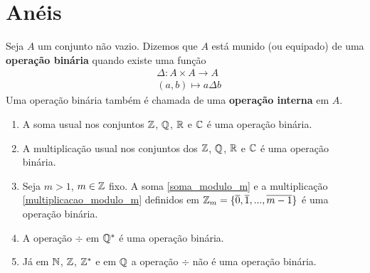\chapter{An{\'e}is}

\begin{definicao}
	Seja $A$ um conjunto n{\~a}o vazio. Dizemos que $A$ est{\'a} munido (ou equipado) de uma \textbf{opera{\c c}{\~a}o bin{\'a}ria} quando existe uma fun{\c c}{\~a}o
	\begin{align*}
		&\Delta : A \times A \to A\\
		&(a,b) \longmapsto a\Delta b		
	\end{align*}
	Uma opera{\c c}{\~a}o bin{\'a}ria tamb{\'e}m {\'e} chamada de uma \textbf{opera{\c c}{\~a}o interna} em $A$.
\end{definicao}

\begin{exemplos}
	\begin{enumerate}[label={\arabic*})]
		\item A soma usual nos conjuntos $\mathbb{Z}$, $\mathbb{Q}$, $\mathbb{R}$ e $\mathbb{C}$ {\'e} uma opera{\c c}{\~a}o bin{\'a}ria.

		\item A multiplicação usual nos conjuntos dos $\mathbb{Z}$, $\mathbb{Q}$, $\mathbb{R}$ e $\mathbb{C}$ {\'e} uma opera{\c c}{\~a}o bin{\'a}ria.

		\item Seja $m > 1$, $m \in \mathbb{Z}$ fixo. A soma \eqref{soma_modulo_m} e a multiplicação \eqref{multiplicacao_modulo_m} definidos em $\mathbb{Z}_m = \{\overline{0},\overline{1},...,\overline{m-1}\}$ é uma operação binária.

		\item A operação $\div$ em $\mathbb{Q}^{*}$ {\'e} uma opera{\c c}{\~a}o bin{\'a}ria.
		\item Já em $\mathbb{N}$, $\mathbb{Z}$, $\mathbb{Z}^{*}$ e em $\mathbb{Q}$ a operação $\div$ n{\~a}o {\'e} uma opera{\c c}{\~a}o bin{\'a}ria.
\end{enumerate}	
\end{exemplos}

